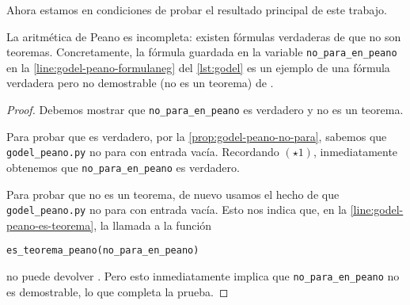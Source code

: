 Ahora estamos en condiciones de probar el resultado principal de este trabajo.

\begin{teorema}\label{teo:incompletitud-peano}
La aritmética de Peano es incompleta: existen fórmulas verdaderas de  que no son teoremas. Concretamente, la fórmula guardada en la variable \texttt{no\_para\_en\_peano} en la \cref{line:godel-peano-formulaneg} del \cref{lst:godel} es un ejemplo de una fórmula verdadera pero no demostrable (no es un teorema) de .
\end{teorema}
\begin{proof}
Debemos mostrar que \texttt{no\_para\_en\_peano} es verdadero y no es un teorema.

Para probar que es verdadero, por la \cref{prop:godel-peano-no-para}, sabemos que \texttt{godel\_peano.py} no para con entrada vacía. Recordando $(\star1)$, inmediatamente obtenemos que \texttt{no\_para\_en\_peano} es verdadero.

Para probar que no es un teorema, de nuevo usamos el hecho de que \texttt{godel\_peano.py} no para con entrada vacía. Esto nos indica que, en la \cref{line:godel-peano-es-teorema}, la llamada a la función
\begin{adjustwidth}{30pt}{}
    \texttt{es\_teorema\_peano(no\_para\_en\_peano)}
\end{adjustwidth}
no puede devolver . Pero esto inmediatamente implica que \texttt{no\_para\_en\_peano} no es demostrable, lo que completa la prueba.
\end{proof}



